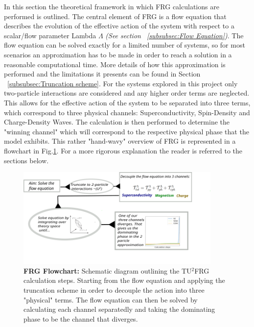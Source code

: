 \documentclass[12pt]{article}
\begin{document}
\medskip

\noindent In this section the theoretical framework in which FRG calculations are performed is outlined. The central element of FRG is a flow equation that describes the evolution of the effective action of the system with respect to a scalar/flow parameter Lambda $\Lambda$ \textit{(See section ~\ref{subsubsec:Flow Equation})}.
The flow equation can be solved exactly for a limited number of systems, so for most scenarios an approximation has to be made in order to reach a solution in a reasonable computational time. More details of how this approximation is performed and the limitations it presents can be found in Section ~\ref{subsubsec:Truncation scheme}. For the systems explored in this project only two-particle
interactions are considered and any higher order terms are neglected.
This allows for the effective action of the system to be separated into three terms, which correspond to three physical channels: Superconductivity, Spin-Density and Charge-Density Waves.
The calculation is then performed to determine the "winning channel" which will correspond to the respective physical phase that the model exhibits. This rather "hand-wavy" overview of FRG is represented in a flowchart in Fig.\ref{fig:FRGflowdiagram}.
For a more rigorous explanation the reader is referred to the sections below. 

\begin{figure}[htbp]  %
    \centering
    \includegraphics[width=0.9\textwidth]{FRGflowdiagram.png}  %
    \caption{\textbf{FRG Flowchart:} Schematic diagram outlining the TU$^2$FRG calculation steps. Starting from the flow equation and applying the truncation scheme in order to decouple the action into three "physical" terms. 
    The flow equation can then be solved by calculating each channel separatedly and taking the dominating phase to be the channel that diverges.}
    \label{fig:FRGflowdiagram}
\end{figure}
\end{document}
